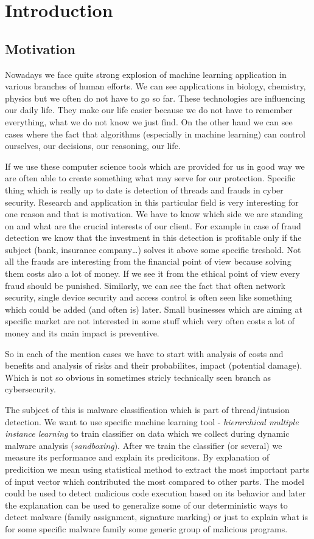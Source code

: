 \chapter{Introduction}
\section{Motivation}
Nowadays we face quite strong explosion of machine learning application in various branches of human efforts. We can see applications in biology, chemistry, physics but we often do not have to go so far. These technologies are influencing our daily life. They make our life easier because we do not have to remember everything, what we do not know we just find. On the other hand we can see cases where the fact that algorithms (especially in machine learning) can control ourselves, our decisions, our reasoning, our life.

If we use these computer science tools which are provided for us in good way we are often able to create something what may serve for our protection. Specific thing which is really up to date is detection of threads and frauds in cyber security. Research and application in this particular field is very interesting for one reason and that is motivation. We have to know which side we are standing on and what are the crucial interests of our client. For example in case of fraud detection we know that the investment in this detection is profitable only if the subject (bank, insurance company\dots) solves it above some specific treshold. Not all the frauds are interesting from the financial point of view because solving them costs also a lot of money. If we see it from the ethical point of view every fraud should be punished. Similarly, we can see the fact that often network security, single device security and access control is often seen like something which could be added (and often is) later. Small businesses which are aiming at specific market are not interested in some stuff which very often costs a lot of money and its main impact is preventive. 

So in each of the mention cases we have to start with analysis of costs and benefits and analysis of risks and their probabilites, impact (potential damage). Which is not so obvious in sometimes stricly technically seen branch as cybersecurity.

The subject of this is malware classification which is part of thread/intusion detection. We want to use specific machine learning tool - \emph{hierarchical multiple instance learning} to train classifier on data which we collect during dynamic malware analysis (\emph{sandboxing}). After we train the classifier (or several) we measure its performance and explain its predicitons. By explanation of predicition we mean using statistical method to extract the most important parts of input vector which contributed the most compared to other parts. The model could be used to detect malicious code execution based on its behavior and later the explanation can be used to generalize some of our deterministic ways to detect malware (family assignment, signature marking) or just to explain what is for some specific malware family some generic group of malicious programs.

